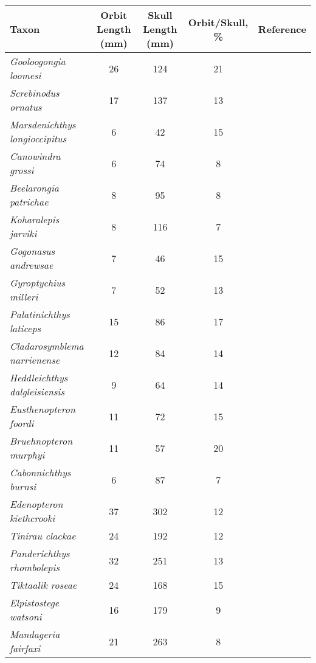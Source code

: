 \begin{tabular}{|L{4.5cm}|c|c|c|L{4.5cm}|}
\hline
\textbf{Taxon}&\textbf{Orbit Length (mm)}&\textbf{Skull Length (mm)}&\textbf{Orbit/Skull, \%}&\textbf{Reference}\\\hline
\textit{Gooloogongia loomesi}&26&124&21&\citet{Joha98a}\\\hline
\textit{Screbinodus ornatus}&17&137&13&\citet{Jeff12a}\\\hline
\textit{Marsdenichthys longioccipitus}&6&42&15&\citet{Holl10a}\\\hline
\textit{Canowindra grossi}&6&74&8&\citet{Long85a}\\\hline
\textit{Beelarongia patrichae}&8&95&8&\citet{Long87a}\\\hline
\textit{Koharalepis jarviki}&8&116&7&\citet{Youn92a}\\\hline
\textit{Gogonasus andrewsae}&7&46&15&\citet{Long06a}\\\hline
\textit{Gyroptychius  milleri}&7&52&13&\citet{Newm15a}\\\hline
\textit{Palatinichthys laticeps}&15&86&17&\citet{Witz12a}\\\hline
\textit{Cladarosymblema narrienense}&12&84&14&\citet{Fox95a}\\\hline
\textit{Heddleichthys dalgleisiensis}&9&64&14&\citet{Snit09a}\\\hline
\textit{Eusthenopteron foordi}&11&72&15&\citet{Mark07a}\\\hline
\textit{Bruehnopteron  murphyi}&11&57&20&\citet{Schu12a}\\\hline
\textit{Cabonnichthys burnsi}&6&87&7&\citet{Ahlb97a}\\\hline
\textit{Edenopteron kiethcrooki}&37&302&12&\citet{Youn13a}\\\hline
\textit{Tinirau clackae}&24&192&12&\citet{Swar12a}\\\hline
\textit{Panderichthys rhombolepis}&32&251&13&\citet{Voro91a}\\\hline
\textit{Tiktaalik roseae}&24&168&15&\citet{Daes06a}\\\hline
\textit{Elpistostege watsoni}&16&179&9&\citet{Schu85a}\\\hline
\textit{Mandageria fairfaxi}&21&263&8&\citet{Joha97a}\\\hline
\end{tabular}
